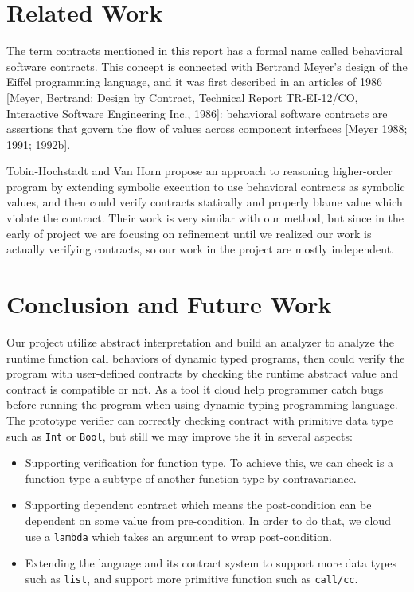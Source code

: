 \documentclass[paper=a4, fontsize=11pt]{scrartcl} %
\numberwithin{equation}{section} %
\numberwithin{figure}{section} %
\numberwithin{table}{section} %
\begin{document}
\section{Related Work}

The term contracts mentioned in this report has a formal name called behavioral software contracts. This concept is connected with Bertrand Meyer's design of the Eiffel programming language, and it was first described in an articles of 1986 [Meyer, Bertrand: Design by Contract, Technical Report TR-EI-12/CO, Interactive Software Engineering Inc., 1986]: behavioral software contracts are assertions that govern the flow of values across component interfaces [Meyer 1988; 1991; 1992b].

Tobin-Hochstadt and Van Horn propose an approach to reasoning higher-order program by extending symbolic execution to use behavioral contracts as symbolic values\cite{Tobin-Hochstadt:2012:HSE:2384616.2384655}, and then could verify contracts statically and properly blame value which violate the contract. Their work is very similar with our method, but since in the early of project we are focusing on refinement until we realized our work is actually verifying contracts, so our work in the project are mostly independent.


\section{Conclusion and Future Work}
Our project utilize abstract interpretation and build an analyzer to analyze the runtime function call behaviors of dynamic typed programs, then could verify the program with user-defined contracts by checking the runtime abstract value and contract is compatible or not. As a tool it cloud help programmer catch bugs before running the program when using dynamic typing programming language. \\

The prototype verifier can correctly checking contract with primitive data type such as \texttt{Int} or \texttt{Bool}, but still we may improve the it in several aspects:
\begin{itemize}
\item Supporting verification for function type. To achieve this, we can check is a function type a subtype of another function type by contravariance.
\item Supporting dependent contract which means the post-condition can be dependent on some value from pre-condition. In order to do that, we cloud use a \texttt{lambda} which takes an argument to wrap post-condition.
\item Extending the language and its contract system to support more data types such as \texttt{list}, and support more primitive function such as \texttt{call/cc}.
\end{itemize}

\renewcommand\refname{Reference}


\end{document}
